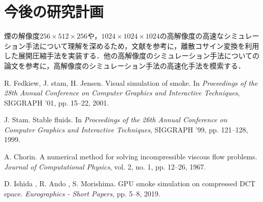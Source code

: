 \documentclass[10pt,a4paper,notitlepage,oneside,twocolumn]{abst_jsarticle}
\begin{document}
\section{今後の研究計画}
煙の解像度$256\times512\times256$や，$1024\times1024\times1024$の高解像度の高速なシミュレーション手法について理解を深めるため，文献\cite{GPU}を参考に，離散コサイン変換を利用した展開圧縮手法を実装する．他の高解像度のシミュレーション手法についての論文を参考に，高解像度のシミュレーション手法の高速化手法を模索する．
\begin{thebibliography}{99}

R. Fedkiew, J. stam, H. Jensen. Visual simulation of smoke. In \textit{Proceedings of the 28th Annual Conference on Computer Graphics and Interactive Techniques}, SIGGRAPH ’01, pp. 15--22, 2001.

J. Stam. Stable fluids. In \textit{Proceedings of the 26th Annual Conference on Computer Graphics and Interactive Techniques}, SIGGRAPH ’99, pp. 121--128, 1999.

A. Chorin. A numerical method for solving incompressible viscous flow problems. \textit{Journal of Computational Physics}, vol. 2, no. 1, pp. 12--26, 1967.

D. Ishida , R. Ando , S. Morishima. GPU smoke simulation on compressed DCT space. \textit{Eurographics - Short Papers}, pp. 5--8, 2019.

\end{thebibliography}
\end{document}
